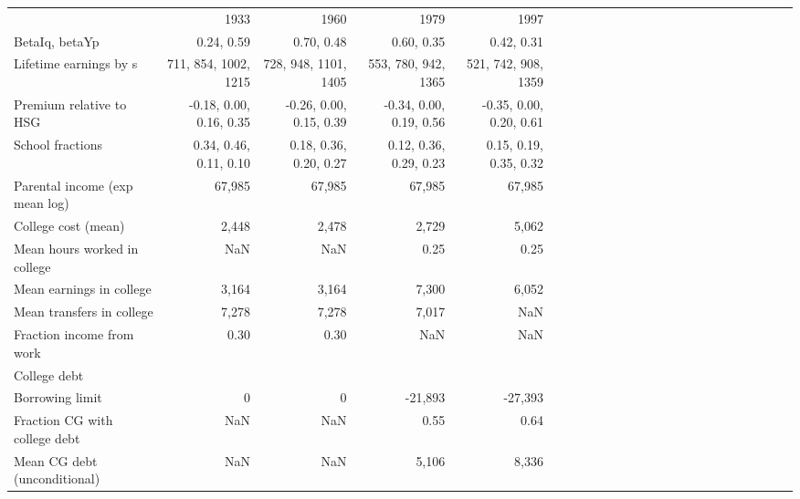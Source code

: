 \begin{tabular}{lrrrrrrrrrrrrrrrrrrrrrrr}
\hline
 & 1933  & 1960  & 1979  & 1997  &   &   &   &   &   &   &   &   &   &   &   &   &   &   &   &   &   &   &   \\ 
BetaIq, betaYp & 0.24, 0.59  & 0.70, 0.48  & 0.60, 0.35  & 0.42, 0.31  &   &   &   &   &   &   &   &   &   &   &   &   &   &   &   &   &   &   &   \\ 
Lifetime earnings by s & 711, 854, 1002, 1215  & 728, 948, 1101, 1405  & 553, 780, 942, 1365  & 521, 742, 908, 1359  &   &   &   &   &   &   &   &   &   &   &   &   &   &   &   &   &   &   &   \\ 
Premium relative to HSG & -0.18, 0.00, 0.16, 0.35  & -0.26, 0.00, 0.15, 0.39  & -0.34, 0.00, 0.19, 0.56  & -0.35, 0.00, 0.20, 0.61  &   &   &   &   &   &   &   &   &   &   &   &   &   &   &   &   &   &   &   \\ 
School fractions & 0.34, 0.46, 0.11, 0.10  & 0.18, 0.36, 0.20, 0.27  & 0.12, 0.36, 0.29, 0.23  & 0.15, 0.19, 0.35, 0.32  &   &   &   &   &   &   &   &   &   &   &   &   &   &   &   &   &   &   &   \\ 
Parental income (exp mean log) & 67,985  & 67,985  & 67,985  & 67,985  &   &   &   &   &   &   &   &   &   &   &   &   &   &   &   &   &   &   &   \\ 
College cost (mean) & 2,448  & 2,478  & 2,729  & 5,062  &   &   &   &   &   &   &   &   &   &   &   &   &   &   &   &   &   &   &   \\ 
Mean hours worked in college & NaN  & NaN  & 0.25  & 0.25  &   &   &   &   &   &   &   &   &   &   &   &   &   &   &   &   &   &   &   \\ 
Mean earnings in college & 3,164  & 3,164  & 7,300  & 6,052  &   &   &   &   &   &   &   &   &   &   &   &   &   &   &   &   &   &   &   \\ 
Mean transfers in college & 7,278  & 7,278  & 7,017  & NaN  &   &   &   &   &   &   &   &   &   &   &   &   &   &   &   &   &   &   &   \\ 
Fraction income from work & 0.30  & 0.30  & NaN  & NaN  &   &   &   &   &   &   &   &   &   &   &   &   &   &   &   &   &   &   &   \\ 
College debt &   &   &   &   &   &   &   &   &   &   &   &   &   &   &   &   &   &   &   &   &   &   &   \\ 
Borrowing limit & 0  & 0  & -21,893  & -27,393  &   &   &   &   &   &   &   &   &   &   &   &   &   &   &   &   &   &   &   \\ 
Fraction CG with college debt & NaN  & NaN  & 0.55  & 0.64  &   &   &   &   &   &   &   &   &   &   &   &   &   &   &   &   &   &   &   \\ 
Mean CG debt (unconditional) & NaN  & NaN  & 5,106  & 8,336  &   &   &   &   &   &   &   &   &   &   &   &   &   &   &   &   &   &   &   \\ 
\hline
\end{tabular}%
